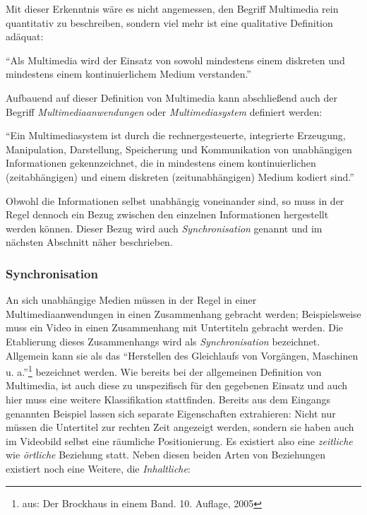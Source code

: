   Mit dieser Erkenntnis wäre es nicht angemessen, den Begriff Multimedia rein quantitativ zu beschreiben, sondern viel mehr ist eine qualitative Definition adäquat:

  \begin{definition}[Multimedia]\label{def:multimedia}
    "`Als Multimedia wird der Einsatz von sowohl mindestens einem diskreten und mindestens einem kontinuierlichem Medium verstanden."'~\emph{\citep[S. 14]{multimedia_technologie}}
  \end{definition}
  
  Aufbauend auf dieser Definition von Multimedia kann abschließend auch der Begriff \emph{Multimediaanwendungen} oder \emph{Multimediasystem} definiert werden:

  \begin{definition}[Multimediasystem]\label{def:multimediasystem}
    "`Ein Multimediasystem ist durch die rechnergesteuerte, integrierte Erzeugung, Manipulation, Darstellung, Speicherung und Kommunikation von unabhängigen Informationen gekennzeichnet, die in mindestens einem kontinuierlichen (zeitabhängigen) und einem diskreten (zeitunabhängigen) Medium kodiert sind."'~\emph{\citep[S. 13]{multimedia_technologie}}
  \end{definition}
  

  Obwohl die Informationen selbst unabhängig voneinander sind, so muss in der Regel dennoch ein Bezug zwischen den einzelnen Informationen hergestellt werden können. Dieser Bezug wird auch \emph{Synchronisation} genannt und im nächsten Abschnitt näher beschrieben.

\subsubsection{Synchronisation} %
\label{ssub:synchronisation}

  An sich unabhängige Medien müssen in der Regel in einer Multimediaanwendungen in einen Zusammenhang gebracht werden; Beispielsweise muss ein Video in einen Zusammenhang mit Untertiteln gebracht werden. Die Etablierung dieses Zusammenhangs wird als \emph{Synchronisation} bezeichnet. Allgemein kann sie als das "`Herstellen des Gleichlaufs von Vorgängen, Maschinen u. a."'\footnote{aus: Der Brockhaus in einem Band. 10. Auflage, 2005} bezeichnet werden. Wie bereits bei der allgemeinen Definition von Multimedia, ist auch diese zu unspezifisch für den gegebenen Einsatz und auch hier muss eine weitere Klassifikation stattfinden. Bereits aus dem Eingangs genannten Beispiel lassen sich separate Eigenschaften extrahieren: Nicht nur müssen die Untertitel zur rechten Zeit angezeigt werden, sondern sie haben auch im Videobild selbst eine räumliche Positionierung. Es existiert also eine \emph{zeitliche} wie \emph{örtliche} Beziehung statt. Neben diesen beiden Arten von Beziehungen existiert noch eine Weitere, die \emph{Inhaltliche}:
  
